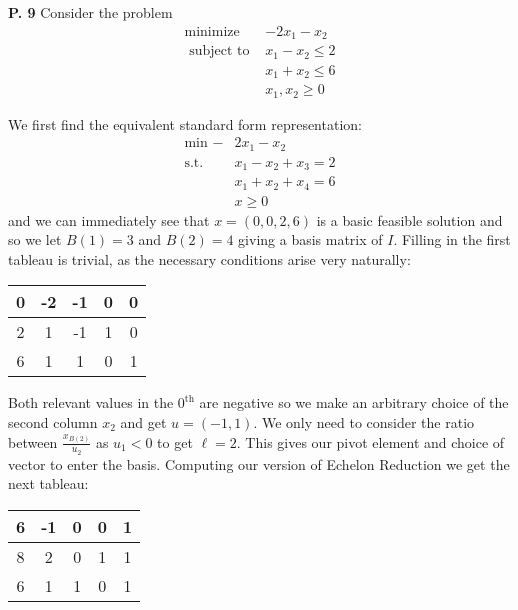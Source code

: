 \documentclass{article}
\begin{document}
\begin{jacklist}
\newpage
    \begin{framed} 
    \item [\textbf{P. 9}] Consider the problem 
        \[\begin{array}{rc}
            \operatorname{minimize} & -2 x_{1}-x_{2} \\
            \text { subject to } & x_{1}-x_{2} \leq 2 \\
            & x_{1}+x_{2} \leq 6 \\
            & x_{1}, x_{2} \geq 0
        \end{array}\]
    \end{framed}
    We first find the equivalent standard form representation: 
    \begin{align*}
        \text{min } -&2x_1 - x_2 \\
        \text{s.t. } &x_1 - x_2 + x_3 = 2 \\
                     &x_1 + x_2 + x_4 = 6 \\
                     & x \geq 0
    \end{align*}
    and we can immediately see that $x = (0,0,2,6)$ is a basic feasible solution and so we let $B(1) = 3$ and $B(2) = 4$ giving a 
    basis matrix of $I$. Filling in the first tableau is trivial, as the necessary conditions arise very naturally: 
    \begin{center}
        \begin{tabular}{|c|cccc|}
           \hline 
           0 & -2 & -1 & 0 & 0 \\
           \hline 
           2 & 1 & -1 & 1 & 0 \\
           6 & 1 & 1 & 0 & 1 \\
           \hline
        \end{tabular}
    \end{center}
    Both relevant values in the $0^{\text{th}}$ are negative so we make an arbitrary choice of the second column $x_2$ and get
    $u = (-1,1)$. We only need to consider the ratio between $ \displaystyle \frac{x_{B(2)}}{u_2}$ as $u_1 < 0$ to get $\ell = 2$. 
    This gives our pivot element and choice of vector to enter the basis. Computing our version of Echelon Reduction we get the next 
    tableau: 
    \begin{center}
        \begin{tabular}{|c|cccc|}
            \hline
            6&-1&0&0&1 \\
            \hline 
            8&2&0&1&1\\
            6&1&1&0&1\\

\end{tabular}
\end{center}
\end{jacklist}
\end{document}
